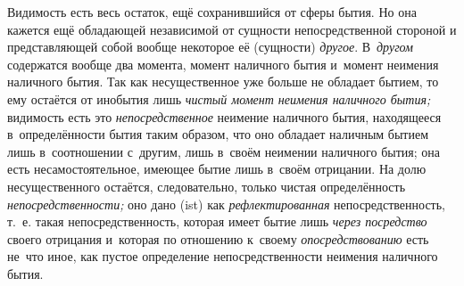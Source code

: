 Видимость есть весь остаток, ещё сохранившийся от сферы бытия. Но она
кажется ещё обладающей независимой от сущности непосредственной стороной и
представляющей собой вообще некоторое её (сущности)
{\em другое}. В~{\em другом}
содержатся вообще два момента, момент наличного бытия и~момент неимения
наличного бытия. Так как несущественное уже больше не обладает бытием, то
ему остаётся от инобытия лишь {\em чистый момент
неимения наличного бытия;} видимость есть это
{\em непосредственное} неимение наличного бытия,
находящееся в~определённости бытия таким образом, что оно обладает наличным
бытием лишь в~соотношении с~другим, лишь в~своём неимении наличного бытия;
она есть несамостоятельное, имеющее бытие лишь в~своём отрицании. На долю
несущественного остаётся, следовательно, только чистая определённость
{\em непосредственности;} оно дано (ist) как
{\em рефлектированная} непосредственность, т.~е. такая
непосредственность, которая имеет бытие лишь {\em через
посредство} своего отрицания и~которая по отношению к~своему
{\em опосредствованию} есть не~что иное, как пустое
определение непосредственности неимения наличного бытия.

